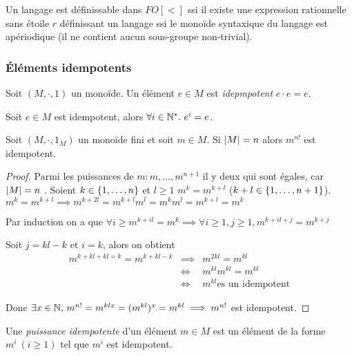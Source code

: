 


\begin{theorem}
	Un langage est définissable dans $FO[<]$ ssi il existe une expression rationnelle sans étoile $r$ définissant un langage
	ssi
	le monoïde syntaxique du langage est apériodique (\cad il ne contient aucun sous-groupe non-trivial).
\end{theorem}

\subsubsection{Éléments idempotents}

\begin{definition}
	Soit $(M,\cdot , 1)$ un monoïde. Un élément $e \in M$ est \emph{idepmpotent} \ssi $e \cdot e = e$.
\end{definition}

\begin{exercice} \label{ex:puiss-idemp}
	Soit $e \in M$ est idempotent, alors $\forall i \in \N^*. \ e^i = e$.
\end{exercice}

\begin{lemma}
	Soit $(M,\cdot , 1_M)$ un monoïde fini et soit $m \in M$. Si $\left|M\right| = n$ alors $m^{n!}$ est idempotent.
\end{lemma}

\begin{proof}
	Parmi les puissances de $m : m, \ldots , m^{n+1}$ il y  deux qui sont égales, car $\left|M\right| = n$ .
	Soient $k \in \left\{1,\ldots,n\right\}$ et $l \geq 1$ \tq $m ^{k} = m ^{k+l}$ ($k + l \in \left\{1,\ldots,n+1\right\}$).
	$m ^{k} = m ^{k+l} \implies m ^{k+2l} = m ^{k+l} m^l = m^k m^l = m^{k+l} = m^k$

	Par induction on a que $\forall i \geq m^{k+il} = m^{k} \implies \forall i \geq 1, j \geq 1, m^{k+il+ j} = m^{k +j}$

	Soit $j = kl - k$ et $i =k$, alors on obtient
	\begin{eqnarray*}
		m^{k+kl+kl=k} = m ^{k + kl -k} &\implies& m^{2kl} = m^{kl} \\
		&\iff& m^{kl}  m^{kl} = m^{kl} \\
		&\iff& m^{kl} \text{es un idempotent}
	\end{eqnarray*}

	Donc $\exists x \in \mathbb{N}, \, m^{n!} = m^{klx} = (m^{kl})^x = m^{kl} \implies m^{n!}$ est idempotent.
\end{proof}


\begin{definition}
	Une \emph{puissance idempotente} d'un élément $m \in M$ est un élément de la forme $m^i \ (i\geq 1)$ tel que $m^i$ est idempotent.
\end{definition}

